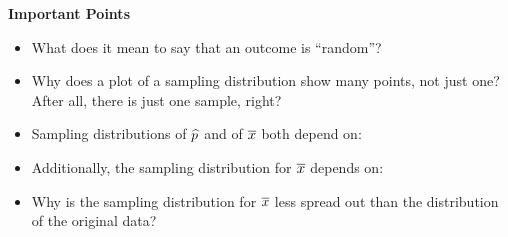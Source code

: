 

{\bf Important Points}
\begin{itemize}
\item What does it mean to say that an outcome is ``random''?\vfill
\item Why does a plot of a sampling distribution show many points, not
  just one? After all, there is just one sample, right?\vfill
\item Sampling distributions of $\widehat{p}$ and of $\overline{x}$ both depend on:
  \vfill
\item Additionally, the sampling distribution for $\overline{x}$ depends
  on:\vfill
\item Why is the sampling distribution for $\overline{x}$ less spread out
  than the distribution of the original data?
\end{itemize}



